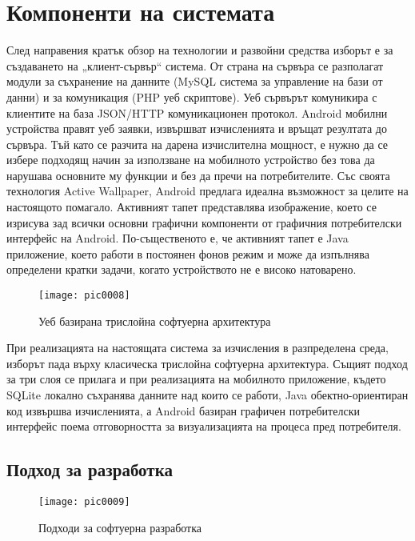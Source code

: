 \section{Компоненти на системата}

След направения кратък обзор на технологии и развойни средства изборът е за създаването на „клиент-сървър“ система. От страна на сървъра се разполагат модули за съхранение на данните (MySQL система за управление на бази от данни) и за комуникация (PHP уеб скриптове). Уеб сървърът комуникира с клиентите на база JSON/HTTP комуникационен протокол. Android мобилни устройства правят уеб заявки, извършват изчисленията и връщат резултата до сървъра. Тъй като се разчита на дарена изчислителна мощност, е нужно да се избере подходящ начин за използване на мобилното устройство без това да нарушава основните му функции и без да пречи на потребителите. Със своята технология Active Wallpaper, Android предлага идеална възможност за целите на настоящото помагало. Активният тапет представлява изображение, което се изрисува зад всички основни графични компоненти от графичния потребителски интерфейс на Android. По-същественото е, че активният тапет е Java приложение, което работи в постоянен фонов режим и може да изпълнява определени кратки задачи, когато устройството не е високо натоварено. 

\begin{figure}[h]
  \centering
  \texttt{[image: pic0008]}
  \caption{Уеб базирана трислойна софтуерна архитектура}
\label{fig:pic0008}
\end{figure}

При реализацията на настоящата система за изчисления в разпределена среда, изборът пада върху класическа трислойна софтуерна архитектура. Същият подход за три слоя се прилага и при реализацията на мобилното приложение, където SQLite локално съхранява данните над които се работи, Java обектно-ориентиран код извършва изчисленията, а Android базиран графичен потребителски интерфейс поема отговорността за визуализацията на процеса пред потребителя. 

\subsection{Подход за разработка}

\begin{figure}[h]
  \centering
  \texttt{[image: pic0009]}
  \caption{Подходи за софтуерна разработка}
\label{fig:pic0009}
\end{figure}

